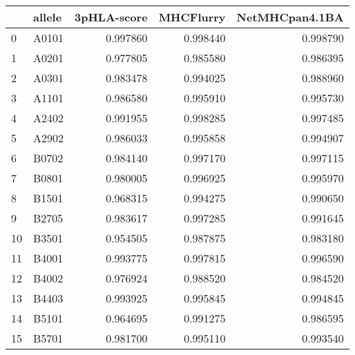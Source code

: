 \begin{tabular}{llrrr}
\toprule
{} & allele &  3pHLA-score &  MHCFlurry &  NetMHCpan4.1BA \\
\midrule
0  &  A0101 &     0.997860 &   0.998440 &        0.998790 \\
1  &  A0201 &     0.977805 &   0.985580 &        0.986395 \\
2  &  A0301 &     0.983478 &   0.994025 &        0.988960 \\
3  &  A1101 &     0.986580 &   0.995910 &        0.995730 \\
4  &  A2402 &     0.991955 &   0.998285 &        0.997485 \\
5  &  A2902 &     0.986033 &   0.995858 &        0.994907 \\
6  &  B0702 &     0.984140 &   0.997170 &        0.997115 \\
7  &  B0801 &     0.980005 &   0.996925 &        0.995970 \\
8  &  B1501 &     0.968315 &   0.994275 &        0.990650 \\
9  &  B2705 &     0.983617 &   0.997285 &        0.991645 \\
10 &  B3501 &     0.954505 &   0.987875 &        0.983180 \\
11 &  B4001 &     0.993775 &   0.997815 &        0.996590 \\
12 &  B4002 &     0.976924 &   0.988520 &        0.984520 \\
13 &  B4403 &     0.993925 &   0.995845 &        0.994845 \\
14 &  B5101 &     0.964695 &   0.991275 &        0.986595 \\
15 &  B5701 &     0.981700 &   0.995110 &        0.993540 \\
\bottomrule
\end{tabular}
